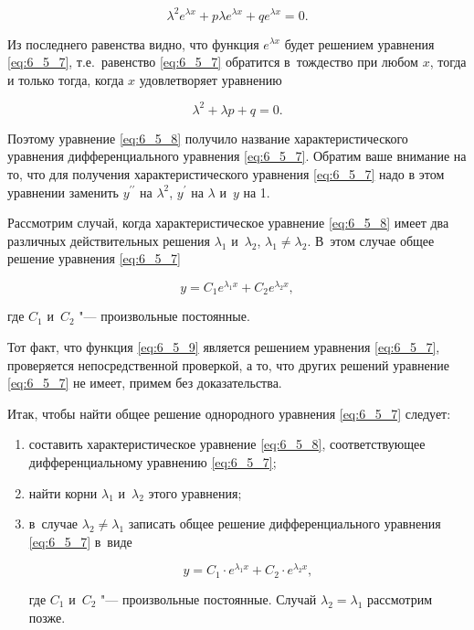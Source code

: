 \begin{equation}\label{eq:6_5_7}
\lambda^{2} e^{\lambda x} + p\lambda e^{\lambda x} + q e^{\lambda x} = 0.
\end{equation}

\noindent
Из последнего равенства видно, что функция $e^{\lambda x}$ будет решением уравнения
\eqref{eq:6_5_7}, т.е.\ равенство \eqref{eq:6_5_7} обратится в~тождество
при любом $x$, тогда и только тогда, когда $x$ удовлетворяет уравнению

\begin{equation}\label{eq:6_5_8}
\lambda^{2} + \lambda p + q = 0.
\end{equation}

Поэтому уравнение \eqref{eq:6_5_8} получило название характеристического уравнения
дифференциального уравнения \eqref{eq:6_5_7}.
Обратим ваше внимание на то, что для получения характеристического уравнения
\eqref{eq:6_5_7} надо в этом уравнении заменить $y^{\prime\prime}$ на $\lambda^{2}$,
$y^\prime$ на $\lambda$ и~$y$ на 1.

Рассмотрим случай, когда характеристическое уравнение \eqref{eq:6_5_8} имеет
два различных действительных решения $\lambda_{1}$ и~$\lambda_{2}$,
$\lambda_{1} \ne \lambda_{2}$.
В~этом случае общее решение уравнения \eqref{eq:6_5_7}

\begin{equation}\label{eq:6_5_9}
y = C_{1} e^{\lambda_{1} x} + C_{2} e^{\lambda_{2} x},
\end{equation}

\noindent
где $C_{1}$ и~$C_{2}$ "--- произвольные постоянные.

Тот факт, что функция \eqref{eq:6_5_9} является решением уравнения \eqref{eq:6_5_7},
проверяется непосредственной проверкой, а то, что других решений уравнение
\eqref{eq:6_5_7} не имеет, примем без доказательства.

Итак, чтобы найти общее решение однородного уравнения \eqref{eq:6_5_7} следует:
\begin{enumerate}
\item составить характеристическое уравнение \eqref{eq:6_5_8}, соответствующее
дифференциальному уравнению \eqref{eq:6_5_7};

\item найти корни $\lambda_{1}$ и~$\lambda_{2}$ этого уравнения;

\item в~случае $\lambda_{2} \ne \lambda_{1}$ записать общее решение дифференциального
уравнения \eqref{eq:6_5_7} в~виде

\begin{equation*}
y = C_{1} \cdot e^{\lambda_{1} x} + C_{2} \cdot e^{\lambda_{2} x},
\end{equation*}

\noindent
где $C_{1}$ и~$C_{2}$ "--- произвольные постоянные.
Случай $\lambda_{2} = \lambda_{1}$ рассмотрим позже.
\end{enumerate}

